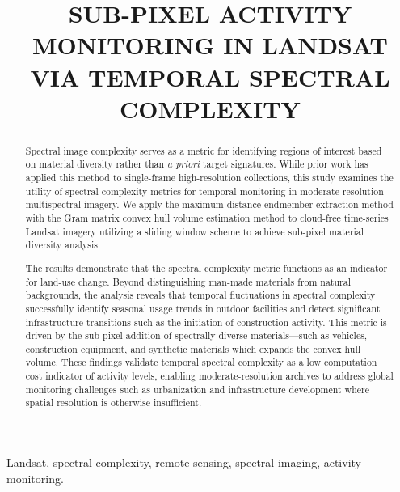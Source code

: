 \documentclass[conference,a4paper]{IEEEtran}
\begin{document}
\title{\uppercase{Sub-Pixel Activity Monitoring in Landsat via Temporal Spectral Complexity}}

\author{	
	\and
}


\maketitle
\begin{abstract}
    Spectral image complexity serves as a metric for identifying regions of interest based on material diversity rather than \textit{a priori} target signatures. While prior work has applied this method to single-frame high-resolution collections, this study examines the utility of spectral complexity metrics for temporal monitoring in moderate-resolution multispectral imagery. We apply the maximum distance endmember extraction method with the Gram matrix convex hull volume estimation method to cloud-free time-series Landsat imagery utilizing a sliding window scheme to achieve sub-pixel material diversity analysis.

    The results demonstrate that the spectral complexity metric functions as an indicator for land-use change. Beyond distinguishing man-made materials from natural backgrounds, the analysis reveals that temporal fluctuations in spectral complexity successfully identify seasonal usage trends in outdoor facilities and detect significant infrastructure transitions such as the initiation of construction activity. This metric is driven by the sub-pixel addition of spectrally diverse materials—such as vehicles, construction equipment, and synthetic materials which expands the convex hull volume. These findings validate temporal spectral complexity as a low computation cost indicator of activity levels, enabling moderate-resolution archives to address global monitoring challenges such as urbanization and infrastructure development where spatial resolution is otherwise insufficient.
\end{abstract}

\begin{IEEEkeywords}
	Landsat, spectral complexity, remote sensing, spectral imaging, activity monitoring.
\end{IEEEkeywords}
\end{document}
